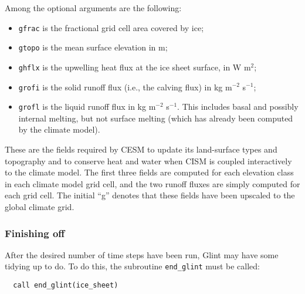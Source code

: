 Among the optional arguments are the following:
\begin{itemize}
\item \texttt{gfrac} is the fractional grid cell area covered by ice;
\item \texttt{gtopo} is the mean surface elevation in m;
\item \texttt{ghflx} is the upwelling heat flux at the ice sheet surface, in W m$^2$;
\item \texttt{grofi} is the solid runoff flux (i.e., the calving flux) in kg m$^{-2}$ s$^{-1}$;
\item \texttt{grofl} is the liquid runoff flux in kg m$^{-2}$ s$^{-1}$.
This includes basal and possibly internal melting, but not surface melting
(which has already been computed by the climate model).
\end{itemize}
%
These are the fields required by CESM to update its land-surface types and topography and to conserve heat
and water when CISM is coupled interactively to the climate model.  
The first three fields are computed for each elevation class in each climate model grid cell,
and the two runoff fluxes are simply computed for each grid cell.
The initial ``g'' denotes that these fields have been upscaled to the global climate grid.
%
\subsubsection{Finishing off}
%
After the desired number of time steps have been run, Glint may have some
tidying up to do. To do this, the subroutine \texttt{end\_glint}
must be called:
%
\begin{verbatim}
  call end_glint(ice_sheet)
\end{verbatim}
%
%
%
